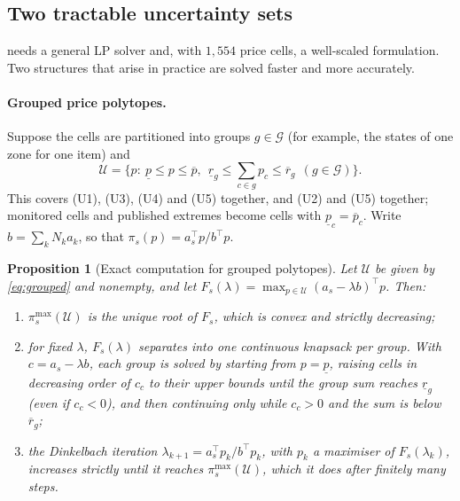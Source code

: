 \documentclass[preprint,12pt,number]{elsarticle}%
\newtheorem{proposition}{Proposition}
\theoremstyle{definition}
\theoremstyle{remark}
\newcommand{\U}{\mathcal{U}}
\newcommand{\pimax}{\pi^{\max}}
\begin{document}
\subsection{Two tractable uncertainty sets}\label{sec:tractable}

 needs a general LP solver and, with $1{,}554$ price cells, a well-scaled formulation. Two structures that arise in practice are solved faster and more accurately.

\paragraph{Grouped price polytopes.} Suppose the cells are partitioned into groups $g\in\mathcal G$ (for example, the states of one zone for one item) and
\begin{equation}\label{eq:grouped}
\U=\Big\{p:\ \underline p\le p\le\overline p,\ \ \underline r_g\le\textstyle\sum_{c\in g}p_c\le\overline r_g\ \ (g\in\mathcal G)\Big\}.
\end{equation}
This covers (U1), (U3), (U4) and (U5) together, and (U2) and (U5) together; monitored cells and published extremes become cells with $\underline p_c=\overline p_c$. Write $b=\sum_kN_ka_k$, so that $\pi_s(p)=a_s^{\top}p/b^{\top}p$.

\begin{proposition}[Exact computation for grouped polytopes]\label{prop:knapsack}
Let $\U$ be given by \eqref{eq:grouped} and nonempty, and let $F_s(\lambda)=\max_{p\in\U}(a_s-\lambda b)^{\top}p$. Then:
\begin{enumerate}
\item[(a)] $\pimax_s(\U)$ is the unique root of $F_s$, which is convex and strictly decreasing;
\item[(b)] for fixed $\lambda$, $F_s(\lambda)$ separates into one continuous knapsack per group. With $c=a_s-\lambda b$, each group is solved by starting from $p=\underline p$, raising cells in decreasing order of $c_c$ to their upper bounds until the group sum reaches $\underline r_g$ (even if $c_c<0$), and then continuing only while $c_c>0$ and the sum is below $\overline r_g$;
\item[(c)] the Dinkelbach iteration $\lambda_{k+1}=a_s^{\top}p_k/b^{\top}p_k$, with $p_k$ a maximiser of $F_s(\lambda_k)$, increases strictly until it reaches $\pimax_s(\U)$, which it does after finitely many steps.
\end{enumerate}
\end{proposition}
\end{document}
